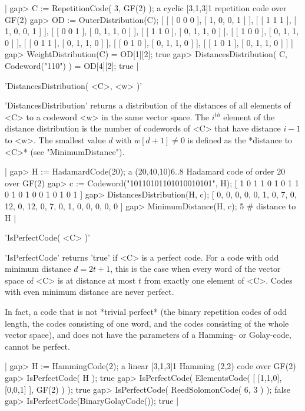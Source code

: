 |    gap> C := RepetitionCode( 3, GF(2) );
    a cyclic [3,1,3]1 repetition code over GF(2)
    gap> OD := OuterDistribution(C);
    [ [ [ 0 0 0 ], [ 1, 0, 0, 1 ] ], [ [ 1 1 1 ], [ 1, 0, 0, 1 ] ],
      [ [ 0 0 1 ], [ 0, 1, 1, 0 ] ], [ [ 1 1 0 ], [ 0, 1, 1, 0 ] ],
      [ [ 1 0 0 ], [ 0, 1, 1, 0 ] ], [ [ 0 1 1 ], [ 0, 1, 1, 0 ] ],
      [ [ 0 1 0 ], [ 0, 1, 1, 0 ] ], [ [ 1 0 1 ], [ 0, 1, 1, 0 ] ] ]
    gap> WeightDistribution(C) = OD[1][2];
    true
    gap> DistancesDistribution( C, Codeword("110") ) = OD[4][2];
    true |


'DistancesDistribution( <C>, <w> )'

'DistancesDistribution' returns a  distribution  of the distances of  all
elements of <C> to a codeword <w> in the same  vector space. The $i^{th}$
element of the  distance distribution is the  number of codewords of  <C>
that have distance $i-1$ to <w>. The smallest value $d$ with $w[d+1] \neq
0$ is defined as the *distance to <C>* (see "MinimumDistance").

|    gap> H := HadamardCode(20);
    a (20,40,10)6..8 Hadamard code of order 20 over GF(2)
    gap> c := Codeword("10110101101010010101", H);
    [ 1 0 1 1 0 1 0 1 1 0 1 0 1 0 0 1 0 1 0 1 ]
    gap> DistancesDistribution(H, c);
    [ 0, 0, 0, 0, 0, 1, 0, 7, 0, 12, 0, 12, 0, 7, 0, 1, 0, 0, 0, 0, 0 ]
    gap> MinimumDistance(H, c);
    5                           # distance to H |


'IsPerfectCode( <C> )'

'IsPerfectCode' returns 'true' if <C> is a perfect  code. For a code with
odd minimum distance $d = 2t+1$, this is the case  when every word of the
vector space of  <C> is at distance at  most $t$ from exactly one element
of <C>. Codes with even minimum distance are never perfect.

In  fact, a code  that is  not  *trivial perfect* (the binary  repetition
codes  of odd length, the  codes  consisting of  one  word, and the codes
consisting of the  whole vector space), and  does not have the parameters
of a Hamming- or Golay-code, cannot be perfect.

|    gap> H := HammingCode(2);
    a linear [3,1,3]1 Hamming (2,2) code over GF(2)
    gap> IsPerfectCode( H );
    true
    gap> IsPerfectCode( ElementsCode( [ [1,1,0], [0,0,1] ], GF(2) ) );
    true
    gap> IsPerfectCode( ReedSolomonCode( 6, 3 ) );
    false
    gap> IsPerfectCode(BinaryGolayCode());
    true |

